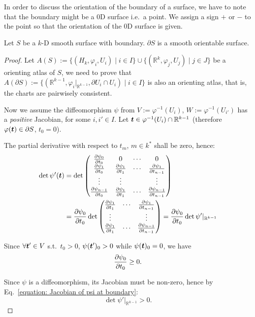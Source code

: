 \documentclass[openany]{book}
\begin{document}
In order to discuss the orientation of the boundary of a surface, we have to note that the boundary might be a 0D surface i.e.\ a point. 
We assign a sign $+$ or $-$ to the point so that the orientation of the 0D surface is given.

\begin{theorem}
	\label{theorem: the orientation of the boundary of a smooth surface}
	Let $S$ be a $k$-D smooth surface with boundary. $\partial S$ is a smooth orientable surface.
\end{theorem}
\begin{proof}
	Let $A(S) := \{(H_k, \varphi_i, U_i) \mid i \in I\} \cup \{(\mathbb R^k, \varphi_j, U_j) \mid j \in J\}$ be a orienting atlas of $S$, we need to prove that $A(\partial S) := \{(\mathbb R^{k-1}, \varphi_i|_{\mathbb R^{k-1}}, \partial U_i \cap U_i) \mid i \in I\}$ is also an orienting atlas, that is, the charts are pairwisely consistent.  

	Now we assume the diffeomorphism $\psi$ from $V := \varphi^{-1}(U_i)$, $W:= \varphi^{-1}(U_{i'})$ has a \emph{positive} Jacobian, for some $i, i' \in I$. 
	Let $\boldsymbol{t} \in \varphi^{-1}(U_i) \cap \mathbb R^{k-1}$ (therefore $\varphi(\boldsymbol{t}) \in \partial S$, $t_0 = 0$).

	The partial derivative with respect to $t_m$, $m \in k^*$ shall be zero, hence:
	\begin{equation}\label{equation: Jacobian of psi at boundary}
		\begin{aligned}
			\det \psi'(\bv t) &= 
		\det \begin{pmatrix}
			\pdiff{\psi_0}{t_0} & 0 & \cdots & 0 \\
			\pdiff{\psi_1}{t_0} & \pdiff{\psi_1}{t_1} & \cdots & \pdiff{\psi_1}{t_{n-1}} \\
			\vdots & \vdots & & \vdots \\
			\pdiff{\psi_{n-1}}{t_0} & \pdiff{\psi_1}{t_1} & \cdots & \pdiff{\psi_{n-1}}{t_{n-1}}
		\end{pmatrix}
		\\
		&= \pdiff{\psi_0}{t_0} 
		\det \begin{pmatrix}
			\pdiff{\psi_1}{t_1} & \cdots & \pdiff{\psi_1}{t_{n-1}} \\
			\vdots & & \vdots \\
			\pdiff{\psi_1}{t_1} & \cdots & \pdiff{\psi_{n-1}}{t_{n-1}}
		\end{pmatrix}
		= \pdiff{\psi_0}{t_0} \det \psi'|_{\mathbb R^{k-1}}
		\end{aligned}
	\end{equation}

	Since $\forall \boldsymbol{t}' \in V$ s.t.\ $t_0 > 0$, $\psi(\boldsymbol{t}')_0 > 0$ while $\psi(\boldsymbol{t})_0 = 0$, we have
	\begin{equation*}
		\pdiff{\psi_0}{t_0} \geq 0.
	\end{equation*}

	Since $\psi$ is a diffeomorphism, its Jacobian must be non-zero, hence by Eq.~\ref{equation: Jacobian of psi at boundary}:
	\begin{equation*}
		\det \psi'|_{\mathbb R^{k-1}} > 0.
	\end{equation*}
\end{proof}
\end{document}
